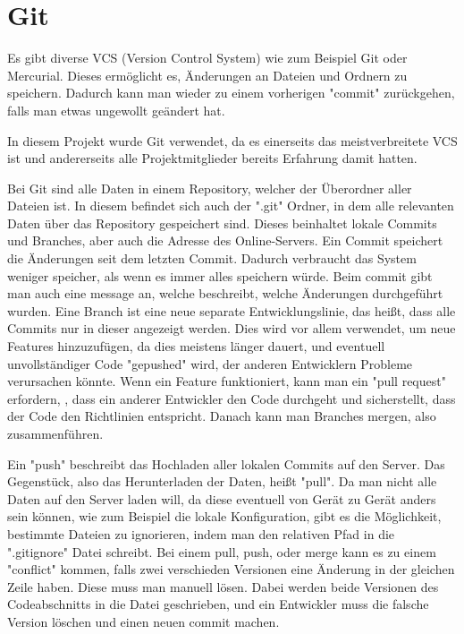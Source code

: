 \section{Git}\label{sec:git}

\renewcommand{\kapitelautor}{Autor: Felix Zwickelstorfer}
Es gibt diverse VCS (Version Control System) wie zum Beispiel Git oder Mercurial.
Dieses ermöglicht es, Änderungen an Dateien und Ordnern zu speichern.
Dadurch kann man wieder zu einem vorherigen "commit" zurückgehen, falls man etwas ungewollt geändert hat.

In diesem Projekt wurde Git verwendet, da es einerseits das meistverbreitete VCS ist und andererseits alle Projektmitglieder bereits Erfahrung damit hatten.

Bei Git sind alle Daten in einem Repository, welcher der Überordner aller Dateien ist.
In diesem befindet sich auch der ".git" Ordner, in dem alle relevanten Daten über das Repository gespeichert sind.
Dieses beinhaltet \zB lokale Commits und Branches, aber auch die Adresse des Online-Servers.
Ein Commit speichert die Änderungen seit dem letzten Commit.
Dadurch verbraucht das System weniger speicher, als wenn es immer alles speichern würde.
Beim commit gibt man auch eine message an, welche beschreibt, welche Änderungen durchgeführt wurden.
Eine Branch ist eine neue separate Entwicklungslinie, das heißt, dass alle Commits nur in dieser angezeigt werden.
Dies wird vor allem verwendet, um neue Features hinzuzufügen, da dies meistens länger dauert, und eventuell unvollständiger Code "gepushed" wird,
der anderen Entwicklern Probleme verursachen könnte.
Wenn ein Feature funktioniert, kann man ein "pull request" erfordern, \dh, dass ein anderer Entwickler den Code durchgeht und sicherstellt,
dass der Code den Richtlinien entspricht.
Danach kann man Branches mergen, also zusammenführen.

Ein "push" beschreibt das Hochladen aller lokalen Commits auf den Server.
Das Gegenstück, also das Herunterladen der Daten, heißt "pull".
Da man nicht alle Daten auf den Server laden will, da diese eventuell von Gerät zu Gerät anders sein können, wie zum Beispiel die lokale Konfiguration,
gibt es die Möglichkeit, bestimmte Dateien zu ignorieren, indem man den relativen Pfad in die ".gitignore" Datei schreibt.
Bei einem pull, push, oder merge kann es zu einem "conflict" kommen, falls zwei verschieden Versionen eine Änderung in der gleichen Zeile haben.
Diese muss man manuell lösen.
Dabei werden beide Versionen des Codeabschnitts in die Datei geschrieben, und ein Entwickler muss die falsche Version löschen und einen neuen commit machen.\cite{gitHomePage}



\renewcommand{\kapitelautor}{}
